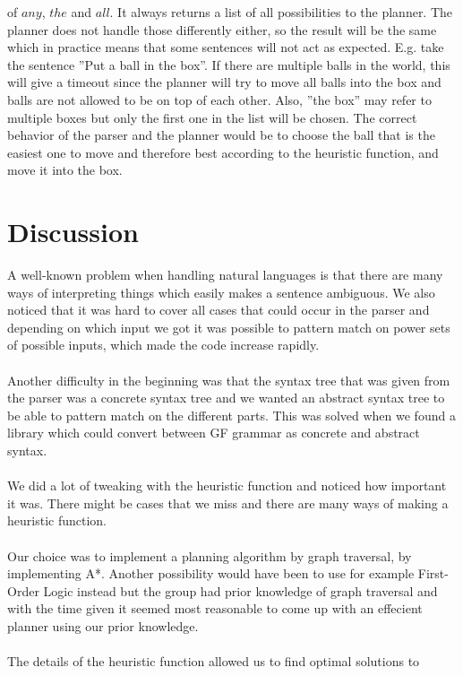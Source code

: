 of $any$, $the$ and $all$. It always returns a list of all possibilities to the
planner. The planner does not handle those differently either, so the result
will be the same which in practice means that some sentences will not act as
expected. E.g. take the sentence ''Put a ball in the box''. If there are
multiple balls in the world, this will give a timeout since the planner will try
to move all balls into the box and balls are not allowed to be on top of each
other. Also, ''the box'' may refer to multiple boxes but only the first one in
the list will be chosen. The correct behavior of the parser and the planner
would be to choose the ball that is the easiest one to move and therefore best
according to the heuristic function, and move it into the box.

\section{Discussion}
A well-known problem when handling natural languages is that there are many ways of interpreting
things which easily makes a sentence ambiguous. We also noticed that it was
hard to cover all cases that could occur in the parser and depending on which
input we got it was possible to pattern match on power sets of possible inputs,
which made the code increase rapidly. \\\\
Another difficulty in the beginning was that the syntax tree that was given
from the parser was a concrete syntax tree and we wanted an abstract syntax
tree to be able to pattern match on the different parts. This was solved when
we found a library which could convert between GF grammar as concrete and
abstract syntax. \\\\
We did a lot of tweaking with the heuristic function and noticed how important it
was. There might be cases that we miss and there are many ways of making a
heuristic function.
\\\\
Our choice was to implement a planning algorithm by graph traversal, by
implementing A*. Another possibility would have been to use for example First-Order
Logic instead but the group had prior knowledge of graph traversal and with the time 
given it seemed most reasonable to come up with an effecient planner using our prior knowledge. 
\\\\
The details of the heuristic function allowed us to find optimal solutions to

